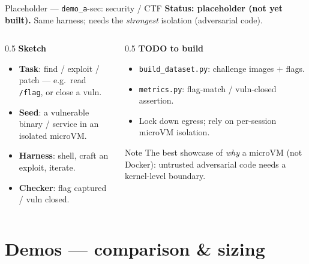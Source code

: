 \documentclass[aspectratio=169]{beamer}
\begin{document}
\begin{frame}{Placeholder --- \texttt{demo\_a}-sec: security / CTF}
  \footnotesize\textbf{Status: placeholder (not yet built).} Same harness; needs the \emph{strongest}
  isolation (adversarial code).
  \begin{columns}[T]
    \begin{column}{0.5\textwidth}
      \textbf{Sketch}
      \begin{itemize}\scriptsize\setlength\itemsep{0.1em}
        \item \textbf{Task}: find / exploit / patch --- e.g.\ read \texttt{/flag}, or close a vuln.
        \item \textbf{Seed}: a vulnerable binary / service in an isolated microVM.
        \item \textbf{Harness}: shell, craft an exploit, iterate.
        \item \textbf{Checker}: flag captured / vuln closed.
      \end{itemize}
    \end{column}
    \begin{column}{0.5\textwidth}
      \textbf{TODO to build}
      \begin{itemize}\scriptsize\setlength\itemsep{0.1em}
        \item \texttt{build\_dataset.py}: challenge images $+$ flags.
        \item \texttt{metrics.py}: flag-match / vuln-closed assertion.
        \item Lock down egress; rely on per-session microVM isolation.
      \end{itemize}
      \begin{block}{Note}
        \scriptsize The best showcase of \emph{why} a microVM (not Docker): untrusted adversarial code
        needs a kernel-level boundary.
      \end{block}
    \end{column}
  \end{columns}
\end{frame}

\section{Demos --- comparison \& sizing}
\end{document}

